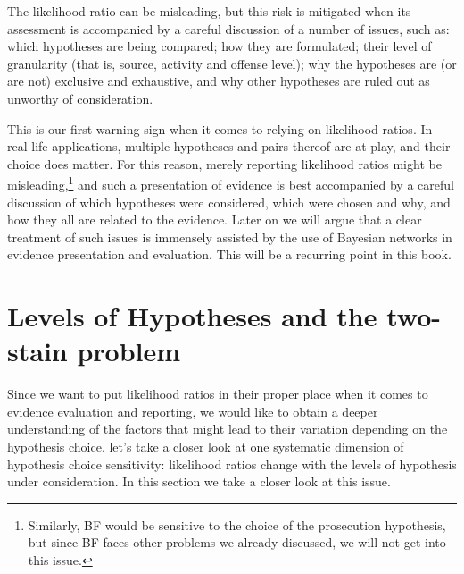 \documentclass[
  10pt,
  dvipsnames,enabledeprecatedfontcommands]{scrartcl}
\begin{document}
The likelihood ratio can be misleading, but this risk is mitigated when
its assessment is accompanied by a careful discussion of a number of
issues, such as: which hypotheses are being compared; how they are
formulated; their level of granularity (that is, source, activity and
offense level); why the hypotheses are (or are not) exclusive and
exhaustive, and why other hypotheses are ruled out as unworthy of
consideration.

This is our first warning sign when it comes to relying on likelihood
ratios. In real-life applications, multiple hypotheses and pairs thereof
are at play, and their choice does matter. For this reason, merely
reporting likelihood ratios might be
misleading,\footnote{Similarly, BF would be sensitive to the choice of the prosecution hypothesis, but since BF faces other problems we already discussed, we will not get into this issue.}
and such a presentation of evidence is best accompanied by a careful
discussion of which hypotheses were considered, which were chosen and
why, and how they all are related to the evidence. Later on we will
argue that a clear treatment of such issues is immensely assisted by the
use of Bayesian networks in evidence presentation and evaluation. This
will be a recurring point in this book.

\hypertarget{levels-of-hypotheses-and-the-two-stain-problem}{%
\section{\texorpdfstring{Levels of Hypotheses and the two-stain problem
\label{sec:lhTwoSTain}}{Levels of Hypotheses and the two-stain problem }}\label{levels-of-hypotheses-and-the-two-stain-problem}}

Since we want to put likelihood ratios in their proper place when it
comes to evidence evaluation and reporting, we would like to obtain a
deeper understanding of the factors that might lead to their variation
depending on the hypothesis choice. let's take a closer look at one
systematic dimension of hypothesis choice sensitivity: likelihood ratios
change with the levels of hypothesis under consideration. In this
section we take a closer look at this issue.
\end{document}
